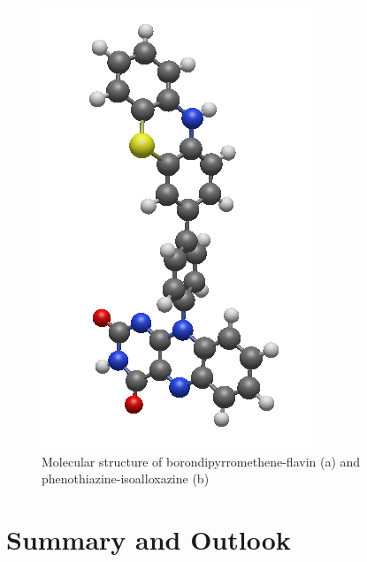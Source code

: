 \begin{figure}
\begin{minipage}{0.4\textwidth}
\includegraphics[width=\textwidth]{Pics/DYAP.png}
\end{minipage}
\caption{Molecular structure of borondipyrromethene-flavin (a) and phenothiazine-isoalloxazine (b)}
\label{fig:ES_ACCMOL}
\end{figure}

\section{Summary and Outlook}


